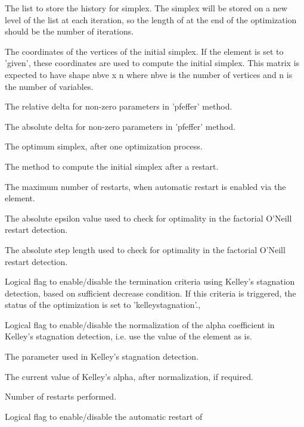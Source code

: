 \begin{Arguments}
\begin{ldescription}
\item[\code{historysimplex}] The list to store the history for simplex. The simplex
will be stored on a new level of the list at each iteration, so the length 
of  at the end of the optimization should be the number
of iterations.
\item[\code{coords0}] The coordinates of the vertices of the initial simplex. If
the  element is set to 'given', these coordinates are
used to compute the initial simplex. This matrix is expected to have
shape nbve x n where nbve is the number of vertices and n is the number of
variables.
\item[\code{simplex0deltausual}] The relative delta for non-zero parameters in
'pfeffer' method.
\item[\code{simplex0deltazero}] The absolute delta for non-zero parameters in
'pfeffer' method.
\item[\code{simplexopt}] The optimum simplex, after one optimization process.
\item[\code{restartsimplexmethod}] The method to compute the initial simplex after
a restart.
\item[\code{restartmax}] The maximum number of restarts, when automatic restart is
enabled via the  element.
\item[\code{restarteps}] The absolute epsilon value used to check for optimality in
the factorial O'Neill restart detection.
\item[\code{restartstep}] The absolute step length used to check for optimality in
the factorial O'Neill restart detection.
\item[\code{kelleystagnationflag}] Logical flag to enable/disable the termination
criteria using Kelley's stagnation detection, based on sufficient decrease
condition. If this criteria is triggered, the status of the optimization
is set to 'kelleystagnation'.,
\item[\code{kelleynormalizationflag}] Logical flag to enable/disable the
normalization of the alpha coefficient in Kelley's stagnation detection,
i.e. use the value of the  element as is.
\item[\code{kelleystagnationalpha0}] The parameter used in Kelley's stagnation
detection.
\item[\code{kelleyalpha}] The current value of Kelley's alpha, after normalization,
if required.
\item[\code{restartnb}] Number of restarts performed.
\item[\code{restartflag}] Logical flag to enable/disable the automatic restart of

\end{ldescription}
\end{Arguments}
